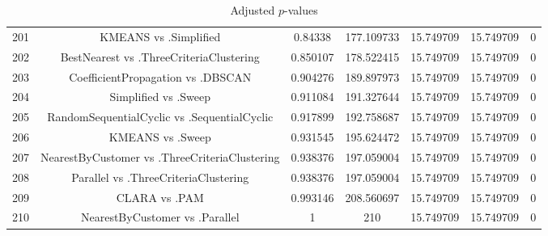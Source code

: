 \documentclass[a4paper,10pt]{article}
\begin{document}
\begin{landscape}
\begin{table}[!htp]
\begin{tabular}{ccccccc}
201&KMEANS vs .Simplified&0.84338&177.109733&15.749709&15.749709&0\\
202&BestNearest vs .ThreeCriteriaClustering&0.850107&178.522415&15.749709&15.749709&0\\
203&CoefficientPropagation vs .DBSCAN&0.904276&189.897973&15.749709&15.749709&0\\
204&Simplified vs .Sweep&0.911084&191.327644&15.749709&15.749709&0\\
205&RandomSequentialCyclic vs .SequentialCyclic&0.917899&192.758687&15.749709&15.749709&0\\
206&KMEANS vs .Sweep&0.931545&195.624472&15.749709&15.749709&0\\
207&NearestByCustomer vs .ThreeCriteriaClustering&0.938376&197.059004&15.749709&15.749709&0\\
208&Parallel vs .ThreeCriteriaClustering&0.938376&197.059004&15.749709&15.749709&0\\
209&CLARA vs .PAM&0.993146&208.560697&15.749709&15.749709&0\\
210&NearestByCustomer vs .Parallel&1&210&15.749709&15.749709&0\\
\hline
\end{tabular}
\caption{Adjusted $p$-values}
\end{table}

\end{landscape}
\end{document}
